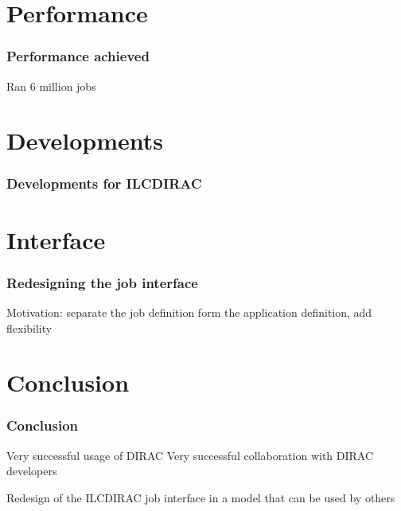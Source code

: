 \documentclass{beamer}
\begin{document}
\section{Performance}
\begin{frame}
  \frametitle{Performance achieved}
Ran 6 million jobs
\end{frame}

\section{Developments}
\begin{frame}
  \frametitle{Developments for ILCDIRAC}

\end{frame}

\section{Interface}
\label{sec:interface}
\begin{frame}
  \frametitle{Redesigning the job interface}

Motivation: separate the job definition form the application
definition, add flexibility

\end{frame}

\section{Conclusion}
\label{sec:conclusion}
\begin{frame}
  \frametitle{Conclusion}
Very successful usage of DIRAC
Very successful collaboration with DIRAC developers

Redesign of the ILCDIRAC job interface in a model that can be used by others
\end{frame}
\end{document}
